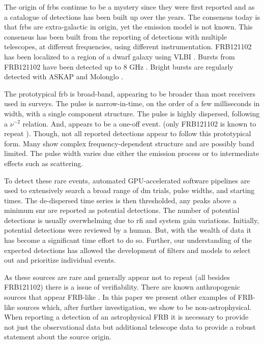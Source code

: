 \documentclass[a4paper,fleqn,usenatbib]{mnras}
\begin{document}
The origin of \glspl{frb} continue to be a mystery since they were first
reported \citep{2007Sci...318..777L} and as a catalogue of detections has been
built up over the years.  The consensus today is that \glspl{frb} are
extra-galactic in origin, yet the emission model is not known.  This consensus
has been built from the reporting of detections with multiple telescopes, at
different frequencies, using different instrumentation.  FRB121102 has been
localized to a region of a dwarf galaxy using VLBI
\citep{2017ApJ...834L...7T,2017Natur.541...58C}.  Bursts from FRB121102 have
been detected up to 8 GHz \citep{atel10675}.  Bright bursts are regularly
detected with ASKAP and Molonglo
\citep{2017ApJ...841L..12B,2017MNRAS.468.3746C,atel10693}. 

The prototypical \gls{frb} is broad-band, appearing to be broader than most
receivers used in surveys. The pulse is narrow-in-time, on the order of a few
milliseconds in width, with a single component structure. The pulse is highly
dispersed, following a $\nu^{-2}$ relation. And, appears to be a one-off event.
(only FRB121102 is known to repeat \citep{2016Natur.531..202S}).  Though, not
all reported detections appear to follow this prototypical form. Many show
complex frequency-dependent structure and are possibly band limited. The pulse
width varies due either the emission process or to intermediate effects such as
scattering.

To detect these rare events, automated GPU-accelerated software pipelines are
used to extensively search a broad range of \gls{dm} trials, pulse widths, and
starting times. The de-dispersed time series is then thresholded, any peaks
above a minimum \gls{snr} are reported as potential detections. The number of
potential detections is usually overwhelming due to \gls{rfi} and system gain
variations. Initially, potential detections were reviewed by a human. But, with
the wealth of data it has become a significant time effort to do so. Further,
our understanding of the expected detections has allowed the development of
filters and models to select out and prioritize individual events.

As these sources are rare
and generally appear not to repeat (all besides FRB121102) there is a issue
of verifiability. There are known anthropogenic sources that appear FRB-like
\citep{2011ApJ...727...18B}. In this paper we present other examples of FRB-like
sources which, after further investigation, we show to be non-astrophysical.
When reporting a detection of an astrophysical FRB it is necessary to provide
not just the observational data but additional telescope data to provide a
robust statement about the source origin.
\end{document}
